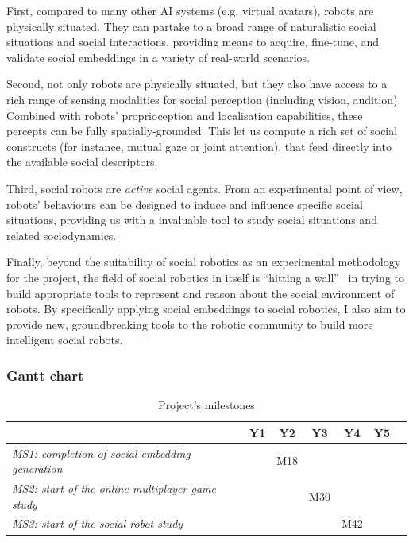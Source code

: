 First, compared to many other AI systems (e.g. virtual avatars), robots
are physically situated.  They can partake to a broad range of naturalistic
social situations and social interactions, providing means to acquire,
fine-tune, and validate social embeddings in a variety of real-world scenarios.

Second, not only robots are physically situated, but they also have access to a rich
range of sensing modalities for social perception (including vision, audition).
Combined with robots' proprioception and localisation capabilities, these
percepts can be fully spatially-grounded. This let us compute a rich set of
social constructs (for instance, mutual gaze or joint attention), that feed
directly into the available social descriptors.

Third, social robots are \emph{active} social agents. From an experimental point
of view, robots' behaviours can be
designed to induce and influence specific social situations, providing us with a
invaluable tool to study social situations and related sociodynamics.

Finally, beyond the suitability of social robotics as an experimental
methodology for the \project project, the field of social robotics in itself is
``hitting a wall''~\cite{yang2018grand} in trying to build appropriate tools to represent and
reason about the social environment of robots. By specifically applying social
embeddings to social robotics, I also aim to provide new, groundbreaking
tools to the robotic community to build more intelligent social robots.

\subsubsection{Gantt chart}

\resizebox{\linewidth}{!}{
    
}
\label{gantt}

\begin{table}[h!]
    \centering
\begin{tabular}{@{}lcccccr@{}}
\toprule
\textit{\textbf{}}              & \textbf{Y1} & \textbf{Y2} & \textbf{Y3} & \textbf{Y4} & \textbf{Y5} \\ \midrule
\textit{MS1: completion of social embedding generation} &   & M18  &    &   &    &     \\ 
\textit{MS2: start of the online multiplayer game study} &   &    & M30  &   &    &     \\ 
\textit{MS3: start of the social robot study} &   &    &    &M42   &     \\ \bottomrule
\end{tabular}
    \caption{Project's milestones}
    \label{milestones}
\end{table}

